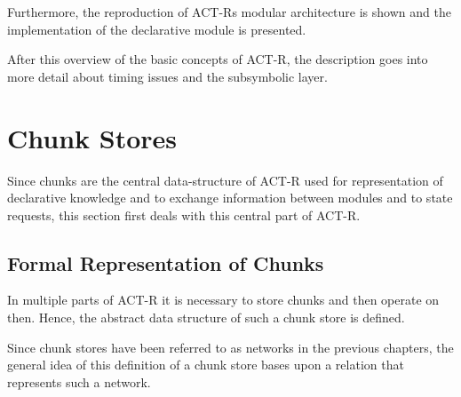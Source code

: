 Furthermore, the reproduction of ACT-Rs modular architecture is shown and the implementation of the declarative module is presented.

After this overview of the basic concepts of ACT-R, the description goes into more detail about timing issues and the subsymbolic layer.

\section{Chunk Stores}

Since chunks are the central data-structure of ACT-R used for representation of declarative knowledge and to exchange information between modules and to state requests, this section first deals with this central part of ACT-R.

\subsection{Formal Representation of Chunks}

In multiple parts of ACT-R it is necessary to store chunks and then operate on then. Hence, the abstract data structure of such a chunk store is defined.

Since chunk stores have been referred to as networks in the previous chapters, the general idea of this definition of a chunk store bases upon a relation that represents such a network.

